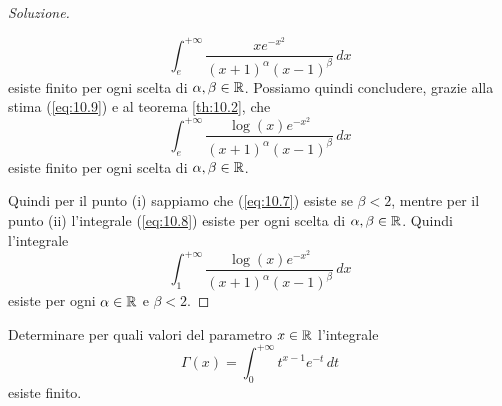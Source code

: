 \begin{proof}[Soluzione]
\begin{enumerate}[(i)]
        \[
        \int_e^{+\infty} \frac{xe^{-x^2}}{(x+1)^\alpha (x-1)^\beta}\, dx
        \]
        esiste finito per ogni scelta di $\alpha, \beta\in\amsbb{R}$. Possiamo quindi concludere, grazie alla stima (\ref{eq:10.9}) e al teorema \ref{th:10.2}, che
        \[
        \int_e^{+\infty} \frac{\log(x)e^{-x^2}}{(x+1)^\alpha (x-1)^\beta}\, dx
        \]
        esiste finito per ogni scelta di $\alpha, \beta\in\amsbb{R}$.
    \end{enumerate}
    Quindi per il punto (i) sappiamo che (\ref{eq:10.7}) esiste se $\beta<2$, mentre per il punto (ii) l'integrale (\ref{eq:10.8}) esiste per ogni scelta di $\alpha,\beta\in\amsbb{R}$. Quindi l'integrale
    \[
    \int_1^{+\infty}  \frac{\log(x)e^{-x^2}}{(x+1)^\alpha (x-1)^\beta}\, dx
    \]
    esiste per ogni $\alpha\in\amsbb{R}$ e $\beta<2$.
\end{proof}
\begin{exercise}
    \label{ex:10.6}
    Determinare per quali valori del parametro $x\in\amsbb{R}$ l'integrale
    \[
    \Gamma(x) = \int_0^{+\infty} t^{x-1} e^{-t}\, dt
    \]
    esiste finito.
\end{exercise}
